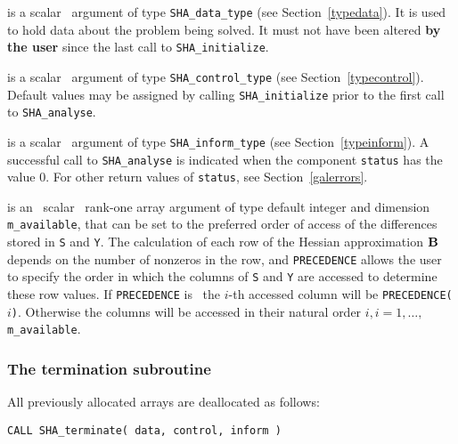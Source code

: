 \documentclass{galahad}
\newcommand{\packagename}{SHA}
\begin{document}
\begin{description}
 is a scalar \intentinout\ argument of type 
{\tt \packagename\_data\_type}
(see Section~\ref{typedata}). It is used to hold data about the problem being 
solved. It must not have been altered {\bf by the user} since the last call to 
{\tt \packagename\_initialize}.

 is a scalar \intentin\ argument of type 
{\tt \packagename\_control\_type}
(see Section~\ref{typecontrol}). Default values may be assigned by calling 
{\tt \packagename\_initialize} prior to the first call to 
{\tt \packagename\_analyse}. 

 is a scalar \intentinout\ argument of type 
{\tt \packagename\_inform\_type}
(see Section~\ref{typeinform}). 
A successful call to
{\tt \packagename\_analyse}
is indicated when the  component {\tt status} has the value 0. 
For other return values of {\tt status}, see Section~\ref{galerrors}.

 is an \optional\ scalar \intentin\ rank-one array argument 
of type default integer and dimension {\tt m\_available}, that can be set
to the preferred order of access of the differences stored 
in {\tt S} and {\tt Y}. The calculation of each row of the 
Hessian approximation ${\mathbf{B}}$ depends on the number of nonzeros in the row,
and {\tt PRECEDENCE} allows the user to specify the order in which the columns
of  {\tt S} and {\tt Y} are accessed to determine these row values. 
If {\tt PRECEDENCE} is \present\, the $i$-th accessed column will be
{\tt PRECEDENCE(}$i${\tt )}. Otherwise the columns will be accessed
in their natural order $i, i = 1, \ldots ,$ {\tt m\_available}.

\end{description}


\subsubsection{The  termination subroutine}
All previously allocated arrays are deallocated as follows:
\vspace*{1mm}

\hspace{8mm}
{\tt CALL \packagename\_terminate( data, control, inform )}
\end{document}
